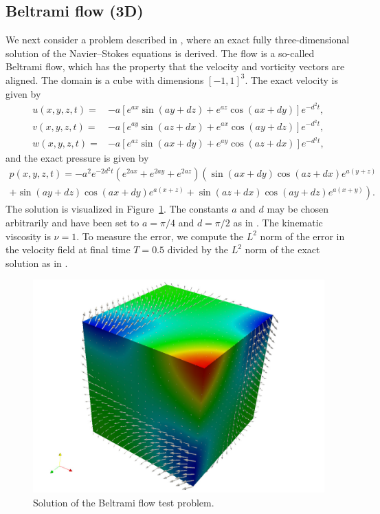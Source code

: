 \subsection{Beltrami flow (3D)}

We next consider a problem described in \citet{EthierSteinmann1994},
where an exact fully three-dimensional solution of the Navier--Stokes
equations is derived. The flow is a so-called Beltrami flow, which has
the property that the velocity and vorticity vectors are aligned. The
domain is a cube with dimensions $[-1, 1]^3$. The exact velocity is
given by
\begin{equation}
  \begin{split}
    u(x,y,z,t) =& -a [ e^{a x} \sin(a y + d z)  + e^{az} \cos(a x + d y) ] e^{-d^{2}t}, \\
    v(x,y,z,t) =& -a [ e^{a y} \sin(a z + d x)  + e^{ax} \cos(a y + d z) ] e^{-d^{2}t}, \\
    w(x,y,z,t) =& -a [ e^{a z} \sin(a x + d y)  + e^{ay} \cos(a z + d x) ] e^{-d^{2}t},
  \end{split}
\end{equation}
and the exact pressure is given by
\begin{multline}
    p(x,y,z,t) = - a^2 e^{-2d^{2}t}
    \left(e^{2ax} + e^{2ay} + e^{2az}\right)
    \left(
    \sin(a x + d y) \cos(a z + d x) e^{a(y+z)} \right.
    \\
    \left. + \sin(a y + d z) \cos(a x + d y) e^{a(x+z)} +
    \sin(a z + d x) \cos(a y + d z) e^{a(x+y)}
    \right).
\end{multline}
The solution is visualized in Figure~\ref{fig:beltrami}. The constants
$a$ and $d$ may be chosen arbitrarily and have been set to $a=\pi/4$
and $d=\pi/2$ as in \citet{EthierSteinmann1994}. The kinematic
viscosity is $\nu = 1$. To measure the error, we compute the $L^2$
norm of the error in the velocity field at final time $T = 0.5$
divided by the $L^2$ norm of the exact solution as in
\citet{EthierSteinmann1994}.

\begin{figure}
  \includegraphics[width=\largefig]{chapters/kvs-1/pdf/new_beltrami_illustration.pdf}
  \caption{Solution of the Beltrami flow test problem.}
  \label{fig:beltrami}
\end{figure}

